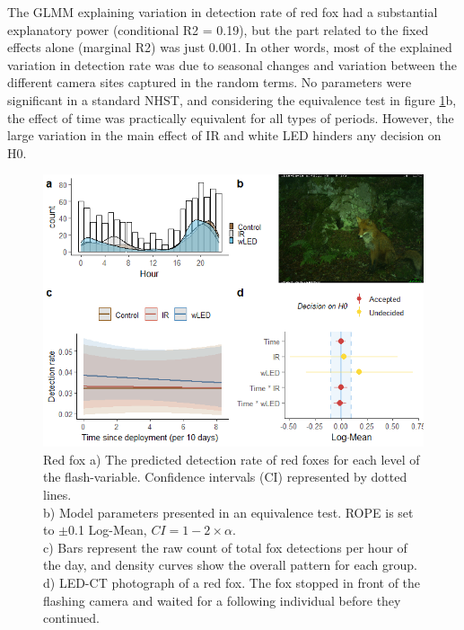 \begin{table}[ht]
The GLMM explaining variation in detection rate of red fox had a substantial explanatory power (conditional R2 = 0.19), but the part related to the fixed effects alone (marginal R2) was just 0.001.
In other words, most of the explained variation in detection rate was due to seasonal changes and variation between the different camera sites captured in the random terms.
No parameters were significant in a standard NHST, and considering the equivalence test in figure \ref{fig:rev}b, the effect of time was practically equivalent for all types of periods.
However, the large variation in the main effect of  IR and white LED hinders any decision on H0. %

\begin{figure}
		  \centering
	\includegraphics[scale=.9]{../R/glmm_sp_files/figure-html/rev2-1.png}
\caption[Red fox]
{Red fox %
a) The predicted detection rate of red foxes for each level of the flash-variable. Confidence intervals (CI) represented by dotted lines.\\ 
b) Model parameters presented in an equivalence test. ROPE is set to $\pm$0.1 Log-Mean, $CI =1 - 2\times \alpha$.\\ 
c) Bars represent the raw count of total fox detections per hour of the day, and density curves show the overall pattern for each group.\\
d) LED-CT photograph of a red fox. The fox stopped in front of the flashing camera and waited for a following individual before they continued.}\label{fig:rev}
\end{figure}



\end{table}
